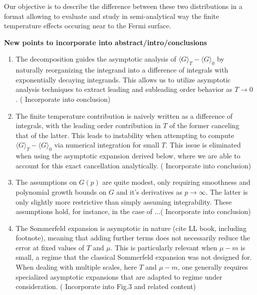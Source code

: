 \documentclass[sn-mathphys,Numbered]{sn-jnl}
\begin{document}
Our objective is to describe the difference between these two distributions in a format allowing to evaluate and study in semi-analytical way the finite temperature effects occuring near to the Fermi surface.

{\bf New points to incorporate into abstract/intro/conclusions}
\begin{enumerate}
\item The decomposition guides the asymptotic analysis of $\langle G\rangle_T-\langle G\rangle_0$ by naturally reorganizing the integrand into a difference of integrals with exponentially decaying integrands. This allows us to utilize asymptotic analysis techniques to   extract  leading and subleading order behavior as $T\to 0$. {(\color{blue} Incorporate into conclusion)}
\item The finite temperature contribution is naively written as a difference of integrals, with the leading order contribution in $T$ of the former canceling that of the latter.  This leads to instability when attempting to compute $\langle G\rangle_T-\langle G\rangle_0$ via numerical integration for small $T$.  This issue is eliminated when using the asymptotic expansion derived below, where we are able to account for this exact cancellation analytically. ({\color{blue} Incorporate into conclusion)}
\item The assumptions on $G(p)$ are quite modest, only requiring smoothness and polynomial growth bounds on $G$ and it's derivatives as $p\to \infty$.  The latter is only slightly more restrictive than simply assuming integrability.  These assumptions hold, for instance, in the case of ...({\color{blue} Incorporate into conclusion)}
\item The Sommerfeld expansion is asymptotic in nature (cite LL book, including footnote), meaning that adding further terms does not necessarily reduce the error at fixed values of $T$ and $\mu$.  This is particularly relevant when $\mu-m$ is small, a regime that the classical Sommerfeld expansion was not designed for.  When dealing with multiple scales, here $T$ and $\mu-m$, one generally requires specialized asymptotic expansions that are adapted to regime under consideration. ({\color{blue} Incorporate into Fig.3 and related content})
\end{enumerate}


 
\end{document}
